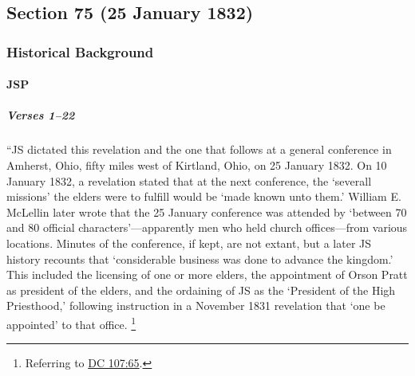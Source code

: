 \subsection{Section 75 (25 January 1832)}
	\label{DC75}
	
	\subsubsection{Historical Background}
		\label{DC75-HB}
		
		\paragraph{JSP}
		
			\subparagraph{Verses 1--22}
			
				``JS dictated this revelation and the one that follows at a general conference in Amherst, Ohio, fifty miles west of Kirtland, Ohio, on 25 January 1832. On 10 January 1832, a revelation stated that at the next conference, the `severall missions' the elders were to fulfill would be `made known unto them.' William E. McLellin later wrote that the 25 January conference was attended by `between 70 and 80 official characters'---apparently men who held church offices---from various locations. Minutes of the conference, if kept, are not extant, but a later JS history recounts that `considerable business was done to advance the kingdom.' This included the licensing of one or more elders, the appointment of Orson Pratt as president of the elders, and the ordaining of JS as the `President of the High Priesthood,' following instruction in a November 1831 revelation that `one be appointed' to that office.%
					\footnote{%
						Referring to \hyperref[DC107-65]{DC 107:65}.
						}

